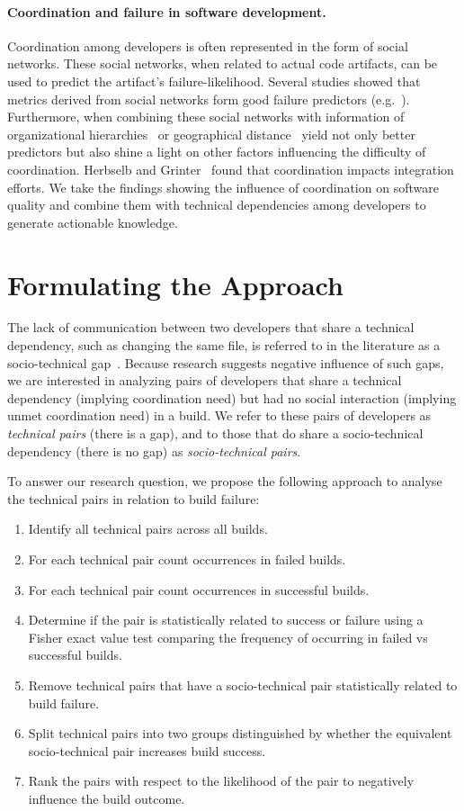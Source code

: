 \documentclass[conference]{IEEEtran}
\begin{document}
\paragraph{Coordination and failure in software development.}
Coordination among developers is often represented in the form of social networks.
These social networks, when related to actual code artifacts, can be used to predict the artifact's failure-likelihood.
Several studies showed that metrics derived from social networks form good failure predictors (e.g.~\cite{meneely:fse:2008}).
Furthermore, when combining these social networks with information of organizational hierarchies~\cite{nagappan:icse:2008} or geographical distance~\cite{bird:acm:2009} yield not only better predictors but also shine a light on other factors influencing the difficulty of coordination.
Herbselb and Grinter~\cite{herbsleb:icse:1999} found that coordination impacts integration efforts.
We take the findings showing the influence of coordination on software quality and combine them with technical dependencies among developers to generate actionable knowledge.

\section{Formulating the Approach}
The lack of communication between two developers that share a
technical dependency, such as changing the same file, is referred to in the literature as a
socio-technical gap~\cite{valetto:msr:2007}. Because research suggests negative influence of such gaps, we are interested in analyzing pairs of developers that share a technical dependency (implying coordination need) but had no social interaction (implying
unmet coordination need) in a build. We refer to these pairs of
developers as \emph{technical pairs} (there is a gap), and to those that do
share a socio-technical dependency (there is no gap) as \emph{socio-technical pairs}. 

To answer our research question, we propose the following approach to analyse the technical pairs in relation to build failure:

\begin{enumerate}
\item Identify all technical pairs across all builds.
\item For each technical pair count occurrences in
failed builds.
\item For each technical pair count occurrences in
successful builds.
\item Determine if the pair is statistically related to success or failure using a Fisher exact value test comparing the frequency of occurring in failed vs successful builds.
\item Remove technical pairs that have a socio-technical pair statistically related to build failure.
\item Split technical pairs into two groups distinguished by whether the equivalent socio-technical pair increases build success.
\item Rank the pairs with respect to the likelihood of the pair to negatively influence the build outcome.
\end{enumerate}
\end{document}
